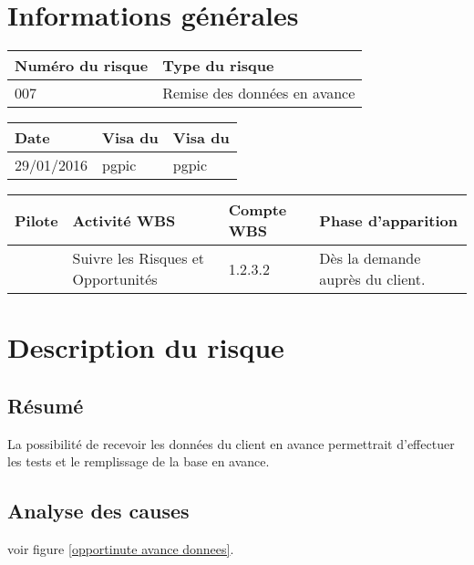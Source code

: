 \section*{Informations générales}
 
\begin{table}[H]
\centering
	\begin{tabularx}{16.8cm}{|X|X|}
	\hline
	\rowcolor{gray!40} Numéro du risque & Type du risque \\
	\hline
	007 &  Remise des données en avance \\
	\hline
	\end{tabularx}
\end{table}

\begin{table}[H]
\centering
	\begin{tabularx}{16.8cm}{|X|X|X|}
	\hline
	\rowcolor{gray!40} Date & Visa du \RQ & Visa du \CP \\
	\hline
	 29/01/2016 & pgpic & pgpic \\
	\hline
	\end{tabularx}
\end{table}

\begin{table}[H]
\centering
	\begin{tabularx}{16.8cm}{|X|X|X|X|}
	\hline
	\rowcolor{gray!40} Pilote & Activité WBS & Compte WBS & Phase d'apparition \\
	\hline
	 \Sergi & Suivre les Risques et Opportunités & 1.2.3.2 & Dès la demande auprès du client.\\
	\hline
	\end{tabularx}
\end{table}

\section*{Description du risque}

\subsection*{Résumé}
	La possibilité de recevoir les données du client en avance permettrait d'effectuer les tests et le remplissage de la base en avance.
	
\subsection*{Analyse des causes}
	voir figure \ref{opportinute avance donnees}.

